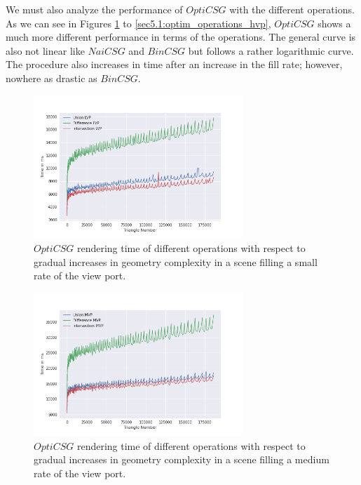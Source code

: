 \documentclass[a4paper,11pt,oneside]{article}
\begin{document}
We must also analyze the performance of $OptiCSG$ with the different operations. As we can see in Figures \ref{sec5.1:optim_operations_lvp} to \ref{sec5.1:optim_operations_hvp}, $OptiCSG$ shows a much more different performance in terms of the operations. The general curve is also not linear like $NaiCSG$ and $BinCSG$ but follows a rather logarithmic curve. The procedure also increases in time after an increase in the fill rate; however, nowhere as drastic as $BinCSG$.

\begin{figure}[H]
	\centering
	\includegraphics[width=0.7\textwidth]{section5/plots/optim_csg_lvp.png}
	\caption{$OptiCSG$ rendering time of different operations with respect to gradual increases in geometry complexity in a scene filling a small rate of the view port.}
	\label{sec5.1:optim_operations_lvp}
\end{figure}

\begin{figure}[H]
	\centering
	\includegraphics[width=0.7\textwidth]{section5/plots/optim_csg_mvp.png}
	\caption{$OptiCSG$ rendering time of different operations with respect to gradual increases in geometry complexity in a scene filling a medium rate of the view port.}
	\label{sec5.1:optim_operations_mvp}
\end{figure}
\end{document}
